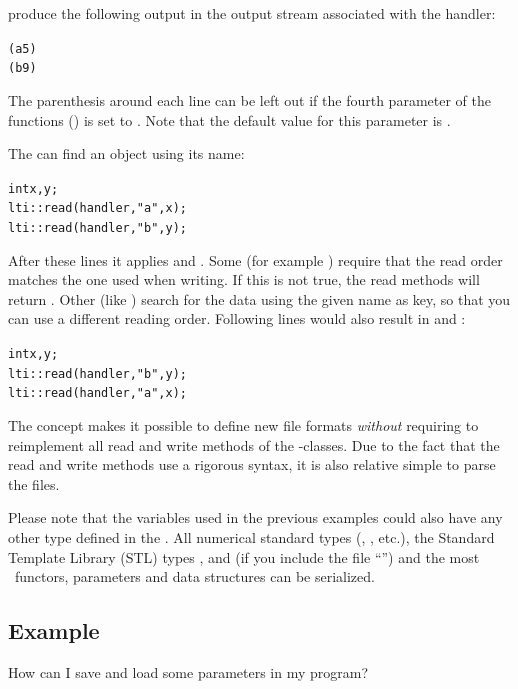 produce the following output in the output stream associated with the handler:
{\small
  \begin{alltt}
    (a 5)
    (b 9)
  \end{alltt}
}

The parenthesis around each line can be left out if the fourth parameter of
the functions () is set to .  Note that the default
value for this parameter is .

The  can find an object using its name:
{\small
\begin{alltt}
  int x,y;
  lti::read(handler,"a",x);
  lti::read(handler,"b",y);
\end{alltt}
}

After these lines it applies  and .  Some
 (for example ) require that the
read order matches the one used when writing.  If this is not true, the read
methods will return .  Other  (like
) search for the data using the given name as key, so
that you can use a different reading order.  Following lines would also result
in  and :

{\small
\begin{alltt}
  int x,y;
  lti::read(handler,"b",y);
  lti::read(handler,"a",x);
\end{alltt}
}

The  concept makes it possible to define new file formats
\emph{without} requiring to reimplement all read and write methods of the
\ltilib-classes.  Due to the fact that the read and write methods use a
rigorous syntax, it is also relative simple to parse the files.

Please note that the variables used in the previous examples could also have
any other type defined in the \ltilib.   All numerical standard types
(, , etc.), the Standard Template Library (STL) types 
,  and  (if you include the
file ``'') and the most \ltilib\ functors,
parameters and data structures can be serialized.

\subsection{Example}

How can I save and load some parameters in my program?

